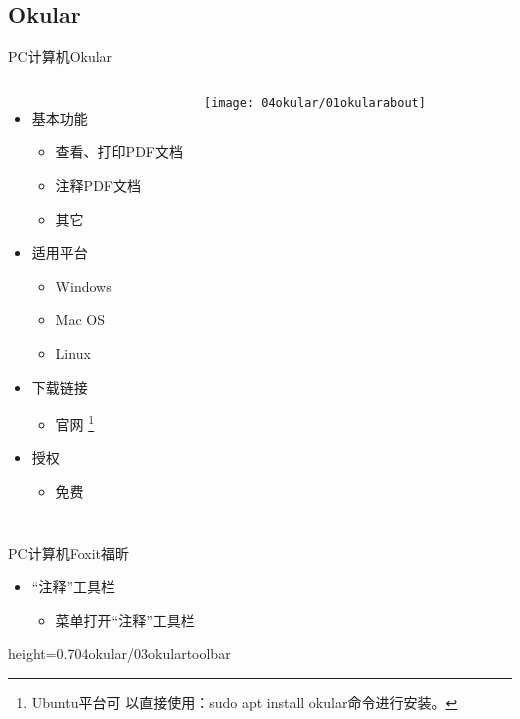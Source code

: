 \documentclass[fontset = none, t, aspectratio=169]{ctexbeamer}
\begin{document}
\subsection{Okular}
\begin{frame}{PC计算机}{Okular}
  \begin{columns}[c]
    \begin{itemize}
    \item 基本功能
      \begin{itemize}
      \item 查看、打印PDF文档
      \item \alert{注释}PDF文档
      \item 其它
      \end{itemize}
    \item 适用平台
      \begin{itemize}
      \item Windows
      \item Mac OS
      \item Linux
      \end{itemize}
    \item 下载链接
      \begin{itemize}
      \item 官网
        \footnote[frame,1]{Ubuntu平台可
          以直接使用：sudo apt install okular命令进行安装。}
      \end{itemize}
    \item 授权
      \begin{itemize}
      \item \alert{免费}
      \end{itemize}
    \end{itemize}
    \texttt{[image: 04okular/01okularabout]}
  \end{columns}
\end{frame}

\begin{frame}{PC计算机}{Foxit福昕}
  \begin{itemize}
  \item \enquote{注释}工具栏
    \begin{itemize}
    \item {}菜单打开\enquote{注释}工具栏
    \end{itemize}
  \end{itemize}
  \begin{center}
    \begin{annotationimage}{height=0.7\textheight}{04okular/03okulartoolbar}
    \end{annotationimage}
  \end{center}
\end{frame}
\end{document}
